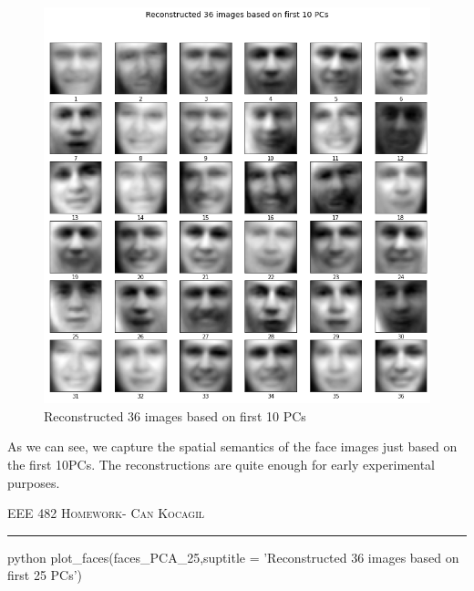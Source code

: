 \documentclass[12pt]{amsart}
\begin{document}
\begin{figure}[h]
    \centering
        \includegraphics[width = 1\textwidth]{images/Q1/Reconstructed 36 images based on first 10 PCs.png}
        \caption{Reconstructed 36 images based on first 10 PCs}
\end{figure}

As we can see, we capture the spatial semantics of the face images just based on the first 10PCs. The reconstructions are quite enough for early experimental purposes.

\newpage
{\scshape EEE 482} \hfill {\scshape \large  Homework-\relax} \hfill {\scshape Can Kocagil}
\smallskip
\hrule
\vspace{2mm}

\begin{mintedbox}{python}
plot_faces(faces_PCA_25,suptitle = 'Reconstructed 36 images based on first 25 PCs')
\end{mintedbox}
\end{document}
